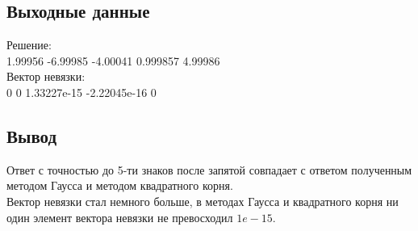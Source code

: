 \documentclass[11.4pt]{article}
\begin{document}
	\subsection{Выходные данные}
		Решение:\\
		1.99956 -6.99985 -4.00041 0.999857 4.99986 \\
		Вектор невязки:\\
		0 0 1.33227e-15 -2.22045e-16 0 \\
	\subsection{Вывод}
		Ответ с точностью до 5-ти знаков после запятой совпадает с ответом 				полученным методом Гаусса и методом квадратного корня.\\
		Вектор невязки стал немного больше, в методах Гаусса и квадратного 				корня ни один элемент вектора невязки не превосходил $1e-15$.
\end{document}
